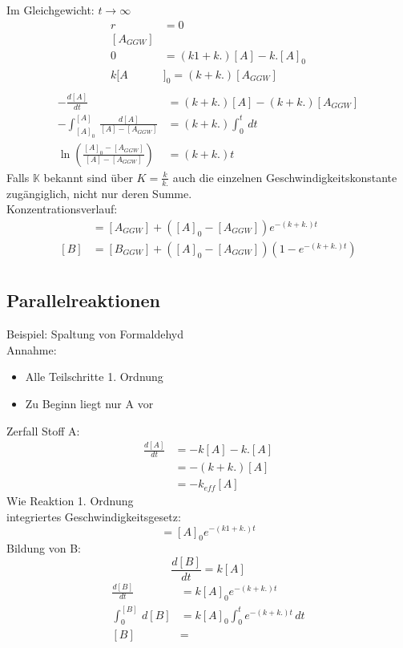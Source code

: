 \documentclass[a4paper, fleqn]{article}
\begin{document}
Im Gleichgewicht: $t \rightarrow \infty$\\
\begin{align*}
    r &= 0\\
    [A_{GGW}]\\
    0 &= (k1+k.)[A]-k.[A]_0\\
    k[A&]_0=(k+k.)[A_{GGW}]\\
\end{align*}
\begin{align*}
    -\frac{d[A]}{dt} &= (k+k.)[A]-(k+k.)[A_{GGW}]\\
    - \int_{[A]_0}^{[A]}\,\frac{d[A]}{[A]-[A_{GGW}]} &= (k+k.) \int_{0}^{t}\,dt\\
    \ln \left(\frac{[A]_0 - [A_{GGW}]}{[A]-[A_{GGW}]}\right) &= (k+k.)t
\end{align*}
Falls $\mathbb{K}$ bekannt sind über $K = \frac{k}{k.}$ auch die einzelnen Geschwindigkeitskonstante zugängiglich, nicht nur deren Summe.\\
Konzentrationsverlauf:
\begin{align*}
    [A] &= [A_{GGW}] + \left([A]_0-[A_{GGW}]\right)e^{-(k+k.)t}\\
    [B] &= [B_{GGW}] + \left([A]_0-[A_{GGW}]\right)\left(1-e^{-(k+k.)t}\right)\\
\end{align*}

\subsection{Parallelreaktionen}
Beispiel: Spaltung von Formaldehyd\\
Annahme:
\begin{itemize}
    \item Alle Teilschritte 1. Ordnung
    \item Zu Beginn liegt nur A vor
\end{itemize}
Zerfall Stoff A:
\begin{align*}
    \frac{d[A]}{dt} &= -k[A]-k.[A]\\
    &= -(k+k.)[A]\\
    &= -k_{eff} [A]
\end{align*}
Wie Reaktion 1. Ordnung\\
integriertes Geschwindigkeitsgesetz:
\begin{equation*}
    [A] = [A]_0 e^{-(k1+k.)t}
\end{equation*}
Bildung von B:
\begin{equation*}
    \frac{d[B]}{dt} = k[A]
\end{equation*}
\begin{align*}
    \frac{d[B]}{dt} &= k[A]_0 e^{-(k+k.)t}\\
    \int_{0}^{[B]}\,d[B] &= k[A]_0 \int_{0}^{t} e^{-(k+k.)t}\,dt\\
    [B] &= 
\end{align*}
\end{document}
